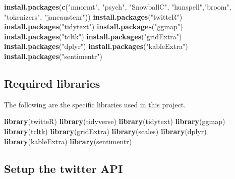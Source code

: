 \documentclass[
  12pt,
]{article}
\newenvironment{Shaded}{\begin{snugshade}}{\end{snugshade}}
\newcommand{\KeywordTok}[1]{\textcolor[rgb]{0.13,0.29,0.53}{\textbf{#1}}}
\newcommand{\NormalTok}[1]{#1}
\newcommand{\StringTok}[1]{\textcolor[rgb]{0.31,0.60,0.02}{#1}}
\begin{document}
\begin{Shaded}
\begin{Highlighting}[]
\KeywordTok{install.packages}\NormalTok{(}\KeywordTok{c}\NormalTok{(}\StringTok{"mnormt"}\NormalTok{, }\StringTok{"psych"}\NormalTok{, }\StringTok{"SnowballC"}\NormalTok{,}
                   \StringTok{"hunspell"}\NormalTok{,}\StringTok{"broom"}\NormalTok{, }\StringTok{"tokenizers"}\NormalTok{, }\StringTok{"janeaustenr"}\NormalTok{))}
\KeywordTok{install.packages}\NormalTok{(}\StringTok{"twitteR"}\NormalTok{)}
\KeywordTok{install.packages}\NormalTok{(}\StringTok{"tidytext"}\NormalTok{)}
\KeywordTok{install.packages}\NormalTok{(}\StringTok{"ggmap"}\NormalTok{)}
\KeywordTok{install.packages}\NormalTok{(}\StringTok{"tcltk"}\NormalTok{)}
\KeywordTok{install.packages}\NormalTok{(}\StringTok{"gridExtra"}\NormalTok{)}
\KeywordTok{install.packages}\NormalTok{(}\StringTok{"dplyr"}\NormalTok{)}
\KeywordTok{install.packages}\NormalTok{(}\StringTok{"kableExtra"}\NormalTok{)}
\KeywordTok{install.packages}\NormalTok{(}\StringTok{"sentimentr"}\NormalTok{)}
\end{Highlighting}
\end{Shaded}

\hypertarget{required-libraries}{%
\subsection{Required libraries}\label{required-libraries}}

The following are the specific libraries used in this project.

\begin{Shaded}
\begin{Highlighting}[]
\KeywordTok{library}\NormalTok{(twitteR)}
\KeywordTok{library}\NormalTok{(tidyverse)}
\KeywordTok{library}\NormalTok{(tidytext)}
\KeywordTok{library}\NormalTok{(ggmap)}
\KeywordTok{library}\NormalTok{(tcltk)}
\KeywordTok{library}\NormalTok{(gridExtra)}
\KeywordTok{library}\NormalTok{(scales)}
\KeywordTok{library}\NormalTok{(dplyr)}
\KeywordTok{library}\NormalTok{(kableExtra)}
\KeywordTok{library}\NormalTok{(sentimentr)}
\end{Highlighting}
\end{Shaded}

\hypertarget{setup-the-twitter-api}{%
\subsection{Setup the twitter API}\label{setup-the-twitter-api}}
\end{document}
